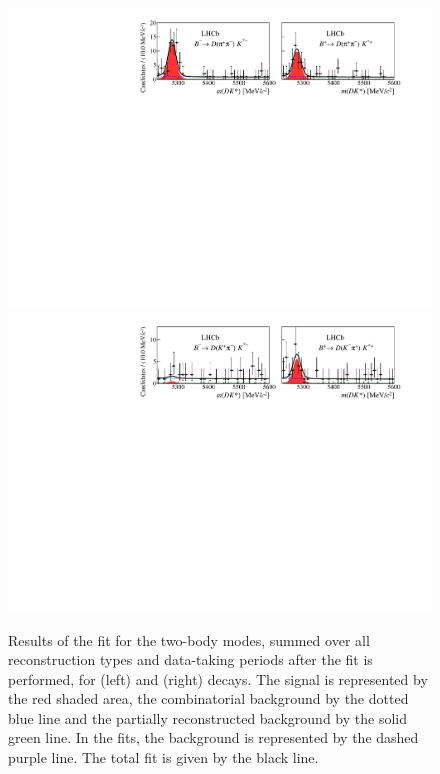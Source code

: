 \begin{figure}
\includegraphics[width=\linewidth]{figures/results/canvas_d2pipi.pdf}
\hfill
\includegraphics[width=\linewidth]{figures/results/canvas_d2pik.pdf}
\caption{Results of the \CP fit for the two-body modes, summed over all \KS reconstruction types and data-taking periods after the fit is performed, for \Bp (left) and \Bm (right) decays. The signal is represented by the red shaded area, the combinatorial background by the dotted blue line and the partially reconstructed background by the solid green line. In the \kk fits, the \decay{\Lb}{\Lc\Kstarm} background is represented by the dashed purple line. The total fit is given by the black line.}
\label{results2body}
\end{figure}

